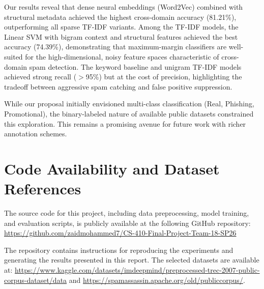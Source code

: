 \documentclass[sigconf]{acmart}
\begin{document}
Our results reveal that dense neural embeddings (Word2Vec) combined with structural metadata achieved the highest cross-domain accuracy (81.21\%), outperforming all sparse TF-IDF variants. Among the TF-IDF models, the Linear SVM with bigram context and structural features achieved the best accuracy (74.39\%), demonstrating that maximum-margin classifiers are well-suited for the high-dimensional, noisy feature spaces characteristic of cross-domain spam detection. The keyword baseline and unigram TF-IDF models achieved strong recall ($>$95\%) but at the cost of precision, highlighting the tradeoff between aggressive spam catching and false positive suppression.

While our proposal initially envisioned multi-class classification (Real, Phishing, Promotional), the binary-labeled nature of available public datasets constrained this exploration. This remains a promising avenue for future work with richer annotation schemes.

\section{Code Availability and Dataset References}
The source code for this project, including data preprocessing, model training, and evaluation scripts, is publicly available at the following GitHub repository:
\url{https://github.com/zaidmohammed7/CS-410-Final-Project-Team-18-SP26}

The repository contains instructions for reproducing the experiments and generating the results presented in this report. The selected datasets are available at:
\url{https://www.kaggle.com/datasets/imdeepmind/preprocessed-trec-2007-public-corpus-dataset/data}
and
\url{https://spamassassin.apache.org/old/publiccorpus/}.
\end{document}
